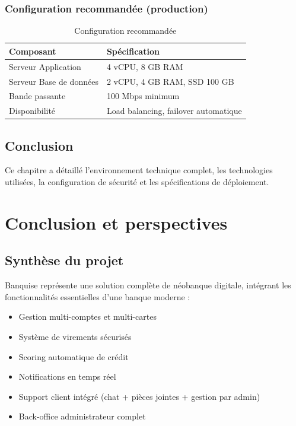 \documentclass[12pt,a4paper]{report}
\begin{document}
\subsection{Configuration recommandée (production)}
\begin{table}[H]
\centering
\begin{tabular}{|p{5cm}|p{9cm}|}
\hline
\rowcolor{banquiseblue!30}
\textbf{Composant} & \textbf{Spécification} \\
\hline
Serveur Application & 4 vCPU, 8 GB RAM \\
\hline
Serveur Base de données & 2 vCPU, 4 GB RAM, SSD 100 GB \\
\hline
Bande passante & 100 Mbps minimum \\
\hline
Disponibilité & Load balancing, failover automatique \\
\hline
\end{tabular}
\caption{Configuration recommandée}
\end{table}

\section{Conclusion}
Ce chapitre a détaillé l'environnement technique complet, les technologies utilisées, la configuration de sécurité et les spécifications de déploiement.

\chapter{Conclusion et perspectives}

\section{Synthèse du projet}
Banquise représente une solution complète de néobanque digitale, intégrant les fonctionnalités essentielles d'une banque moderne :
\begin{itemize}[leftmargin=1.5cm]
    \item Gestion multi-comptes et multi-cartes
    \item Système de virements sécurisés
    \item Scoring automatique de crédit
    \item Notifications en temps réel
    \item Support client intégré (chat + pièces jointes + gestion par admin)
    \item Back-office administrateur complet
\end{itemize}
\end{document}
